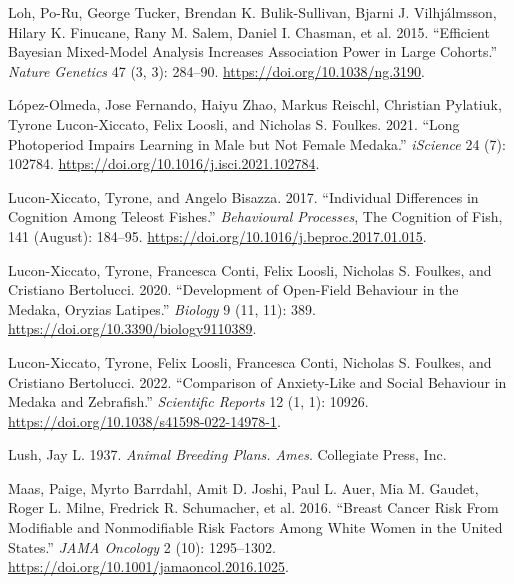 \documentclass[
]{book}
\newlength{\cslhangindent}
\newlength{\cslentryspacingunit} %
\newenvironment{CSLReferences}[2] %
 {%
  \setlength{\parindent}{0pt}
  \ifodd #1
  \let\oldpar\par
  \def\par{\hangindent=\cslhangindent\oldpar}
  \fi
  \setlength{\parskip}{#2\cslentryspacingunit}
 }%
 {}
\begin{document}
\begin{CSLReferences}{1}{0}
\leavevmode{}%
Loh, Po-Ru, George Tucker, Brendan K. Bulik-Sullivan, Bjarni J. Vilhjálmsson, Hilary K. Finucane, Rany M. Salem, Daniel I. Chasman, et al. 2015. {``Efficient {Bayesian} Mixed-Model Analysis Increases Association Power in Large Cohorts.''} \emph{Nature Genetics} 47 (3, 3): 284--90. \url{https://doi.org/10.1038/ng.3190}.

\leavevmode{}%
López-Olmeda, Jose Fernando, Haiyu Zhao, Markus Reischl, Christian Pylatiuk, Tyrone Lucon-Xiccato, Felix Loosli, and Nicholas S. Foulkes. 2021. {``Long Photoperiod Impairs Learning in Male but Not Female Medaka.''} \emph{iScience} 24 (7): 102784. \url{https://doi.org/10.1016/j.isci.2021.102784}.

\leavevmode{}%
Lucon-Xiccato, Tyrone, and Angelo Bisazza. 2017. {``Individual Differences in Cognition Among Teleost Fishes.''} \emph{Behavioural Processes}, The {Cognition} of {Fish}, 141 (August): 184--95. \url{https://doi.org/10.1016/j.beproc.2017.01.015}.

\leavevmode{}%
Lucon-Xiccato, Tyrone, Francesca Conti, Felix Loosli, Nicholas S. Foulkes, and Cristiano Bertolucci. 2020. {``Development of {Open-Field Behaviour} in the {Medaka}, {Oryzias} Latipes.''} \emph{Biology} 9 (11, 11): 389. \url{https://doi.org/10.3390/biology9110389}.

\leavevmode{}%
Lucon-Xiccato, Tyrone, Felix Loosli, Francesca Conti, Nicholas S. Foulkes, and Cristiano Bertolucci. 2022. {``Comparison of Anxiety-Like and Social Behaviour in Medaka and Zebrafish.''} \emph{Scientific Reports} 12 (1, 1): 10926. \url{https://doi.org/10.1038/s41598-022-14978-1}.

\leavevmode{}%
Lush, Jay L. 1937. \emph{Animal Breeding Plans. {Ames}}. {Collegiate Press, Inc}.

\leavevmode{}%
Maas, Paige, Myrto Barrdahl, Amit D. Joshi, Paul L. Auer, Mia M. Gaudet, Roger L. Milne, Fredrick R. Schumacher, et al. 2016. {``Breast {Cancer Risk From Modifiable} and {Nonmodifiable Risk Factors Among White Women} in the {United States}.''} \emph{JAMA Oncology} 2 (10): 1295--1302. \url{https://doi.org/10.1001/jamaoncol.2016.1025}.


\end{CSLReferences}
\end{document}

